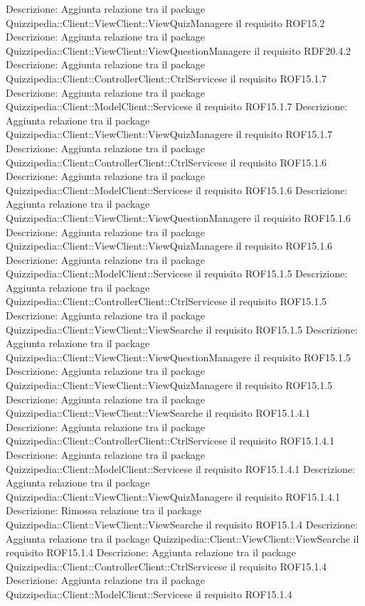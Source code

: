 Descrizione: Aggiunta relazione tra il package Quizzipedia::Client::ViewClient::ViewQuizManagere il requisito ROF15.2 
Descrizione: Aggiunta relazione tra il package Quizzipedia::Client::ViewClient::ViewQuestionManagere il requisito RDF20.4.2 
Descrizione: Aggiunta relazione tra il package Quizzipedia::Client::ControllerClient::CtrlServicese il requisito ROF15.1.7 
Descrizione: Aggiunta relazione tra il package Quizzipedia::Client::ModelClient::Servicese il requisito ROF15.1.7 
Descrizione: Aggiunta relazione tra il package Quizzipedia::Client::ViewClient::ViewQuizManagere il requisito ROF15.1.7 
Descrizione: Aggiunta relazione tra il package Quizzipedia::Client::ControllerClient::CtrlServicese il requisito ROF15.1.6 
Descrizione: Aggiunta relazione tra il package Quizzipedia::Client::ModelClient::Servicese il requisito ROF15.1.6 
Descrizione: Aggiunta relazione tra il package Quizzipedia::Client::ViewClient::ViewQuestionManagere il requisito ROF15.1.6 
Descrizione: Aggiunta relazione tra il package Quizzipedia::Client::ViewClient::ViewQuizManagere il requisito ROF15.1.6 
Descrizione: Aggiunta relazione tra il package Quizzipedia::Client::ModelClient::Servicese il requisito ROF15.1.5 
Descrizione: Aggiunta relazione tra il package Quizzipedia::Client::ControllerClient::CtrlServicese il requisito ROF15.1.5 
Descrizione: Aggiunta relazione tra il package Quizzipedia::Client::ViewClient::ViewSearche il requisito ROF15.1.5 
Descrizione: Aggiunta relazione tra il package Quizzipedia::Client::ViewClient::ViewQuestionManagere il requisito ROF15.1.5 
Descrizione: Aggiunta relazione tra il package Quizzipedia::Client::ViewClient::ViewQuizManagere il requisito ROF15.1.5 
Descrizione: Aggiunta relazione tra il package Quizzipedia::Client::ViewClient::ViewSearche il requisito ROF15.1.4.1 
Descrizione: Aggiunta relazione tra il package Quizzipedia::Client::ControllerClient::CtrlServicese il requisito ROF15.1.4.1 
Descrizione: Aggiunta relazione tra il package Quizzipedia::Client::ModelClient::Servicese il requisito ROF15.1.4.1 
Descrizione: Aggiunta relazione tra il package Quizzipedia::Client::ViewClient::ViewQuizManagere il requisito ROF15.1.4.1 
Descrizione: Rimossa relazione tra il package Quizzipedia::Client::ViewClient::ViewSearche il requisito ROF15.1.4 
Descrizione: Aggiunta relazione tra il package Quizzipedia::Client::ViewClient::ViewSearche il requisito ROF15.1.4 
Descrizione: Aggiunta relazione tra il package Quizzipedia::Client::ControllerClient::CtrlServicese il requisito ROF15.1.4 
Descrizione: Aggiunta relazione tra il package Quizzipedia::Client::ModelClient::Servicese il requisito ROF15.1.4 
